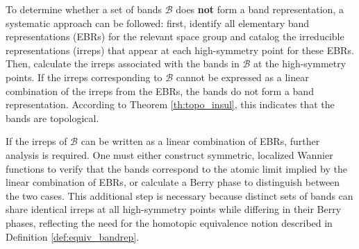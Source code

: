 \documentclass[12pt]{report}
\begin{document}
%
%
%


To determine whether a set of bands \(\mathcal{B}\) does \textbf{not} form a band representation, a systematic approach can be followed: first, identify all elementary band representations (EBRs) for the relevant space group and catalog the irreducible representations (irreps) that appear at each high-symmetry point for these EBRs. Then, calculate the irreps associated with the bands in \(\mathcal{B}\) at the high-symmetry points. If the irreps corresponding to \(\mathcal{B}\) cannot be expressed as a linear combination of the irreps from the EBRs, the bands do not form a band representation. According to Theorem \ref{th:topo_insul}, this indicates that the bands are topological.

If the irreps of \(\mathcal{B}\) can be written as a linear combination of EBRs, further analysis is required. One must either construct symmetric, localized Wannier functions to verify that the bands correspond to the atomic limit implied by the linear combination of EBRs, or calculate a Berry phase to distinguish between the two cases. This additional step is necessary because distinct sets of bands can share identical irreps at all high-symmetry points while differing in their Berry phases, reflecting the need for the homotopic equivalence notion described in Definition \ref{def:equiv_bandrep}.
\end{document}
